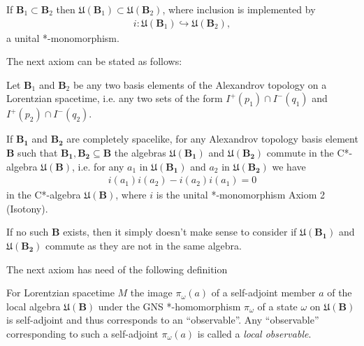 \begin{definition}
\begin{definition}
    If $\mathbf{B}_1 \subset \mathbf{B}_2$ then $\mathfrak{U}(\mathbf{B}_1) \subset \mathfrak{U}(\mathbf{B}_2)$, where inclusion is implemented by
    \begin{align}
        i : \mathfrak{U}(\mathbf{B}_1) \hookrightarrow \mathfrak{U}(\mathbf{B}_2),
    \end{align}
    a unital *-monomorphism.
\end{definition}

The next axiom can be stated as follows:

\begin{definition}
    \label{def:local-commutativity-in-curved-spacetime}
    Let $\mathbf{B}_1$ and $\mathbf{B}_2$ be any two basis elements of the Alexandrov topology on a Lorentzian spacetime, i.e. any two sets of the form $I^+(p_1) \cap I^-(q_1)$ and $I^+(p_2) \cap I^-(q_2)$.
    
    If $\mathbf{B_1}$ and $\mathbf{B_2}$ are completely spacelike, for any Alexandrov topology basis element $\mathbf{B}$ such that $\mathbf{B_1}, \mathbf{B_2} \subseteq \mathbf{B}$ the algebras $\mathfrak{U}(\mathbf{B_1})$ and $\mathfrak{U}(\mathbf{B_2})$ commute in the C*-algebra $\mathfrak{U}(\mathbf{B})$, i.e. for any $a_1$ in $\mathfrak{U}(\mathbf{B_1})$ and $a_2$ in $\mathfrak{U}(\mathbf{B_2})$ we have
    \begin{align}
        i(a_1) i(a_2) - i(a_2) i(a_1) = 0
    \end{align}
    in the C*-algebra $\mathfrak{U}(\mathbf{B})$, where $i$ is the unital *-monomorphism Axiom 2 (Isotony).
    
    If no such $\mathbf{B}$ exists, then it simply doesn't make sense to consider if $\mathfrak{U}(\mathbf{B_1})$ and $\mathfrak{U}(\mathbf{B_2})$ commute as they are not in the same algebra.
\end{definition}

The next axiom has need of the following definition

\begin{definition}
    \label{def:local-observable}
    For Lorentzian spacetime $M$ the image $\pi_\omega(a)$ of a self-adjoint member $a$ of the local algebra $\mathfrak{U}(\mathbf{B})$ under the GNS *-homomorphism $\pi_\omega$ of a state $\omega$ on $\mathfrak{U}(\mathbf{B})$ is self-adjoint and thus corresponds to an ``observable''. Any ``observable'' corresponding to such a self-adjoint $\pi_\omega(a)$ is called a \textit{local observable}.
\end{definition}


\end{definition}
